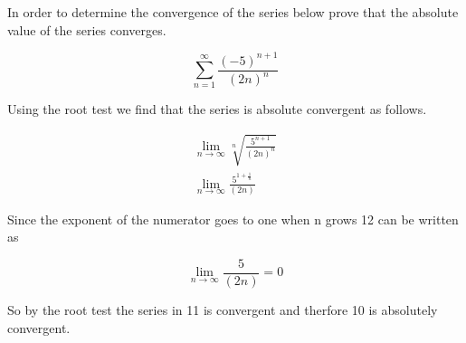 \documentclass[a4paper]{article}
\begin{document}
In order to determine the convergence of the series below prove that the absolute value of the series converges. 

\begin{equation}
    \sum_{n=1}^{\infty} \frac{(-5)^{n+1}}{(2n)^n}
\end{equation}

Using the root test we find that the series is absolute convergent as follows.

\begin{align}
    \lim_{n\to\infty} \sqrt[n]{\frac{5^{n+1}}{(2n)^n}} \\
    \lim_{n\to\infty} \frac{5^{1+\frac{1}{n}}}{(2n)}
\end{align}

Since the exponent of the numerator goes to one when n grows 12 can be written as 

\begin{equation}
    \lim_{n\to\infty} \frac{5}{(2n)} = 0
\end{equation}

So by the root test the series in 11 is convergent and therfore 10 is absolutely convergent.
\end{document}

